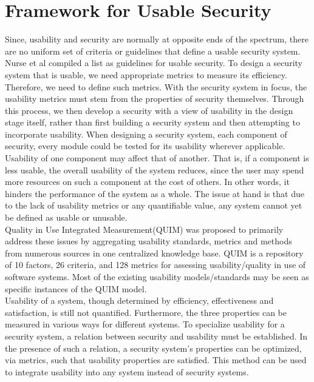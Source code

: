 \section{Framework for Usable Security}
Since, usability and security are normally at opposite ends of the spectrum, there are no uniform set of criteria or guidelines that define a usable security system. Nurse et al\cite{nurse2011guidelines} 
compiled a list as guidelines for usable security.
\newline
To design a security system that is usable, we need appropriate metrics to measure its efficiency. Therefore, we need to define such metrics. With the security system in focus, the usability metrics must stem from the properties of security themselves. Through this process, we then develop a security with a view of usability in the design stage itself, rather than first building a security system and then attempting to incorporate usability. When designing a security system, each component of security, every module could be tested for its usability wherever applicable. Usability of one component may affect that of another. That is, if a component is less usable, the overall usability of the system reduces, since the user may spend more resources on such a component at the cost of others. In other words, it hinders the performance of the system as a whole. The issue at hand is that due to the lack of usability metrics or any quantifiable value, any system cannot yet be defined as usable or unusable. \\


Quality in Use Integrated Measurement(QUIM)\cite{seffah2001quim} was proposed to primarily address these issues by aggregating usability standards, metrics and methods from numerous sources in one centralized knowledge base. QUIM is a repository of 10 factors, 26 criteria, and 128 metrics for assessing usability/quality in use of software systems. Most of the existing usability models/standards may be seen as specific instances of the QUIM model. \\

Usability of a system, though determined by efficiency, effectiveness and satisfaction, is still not quantified. Furthermore, the three properties can be measured in various ways for different systems. To specialize usability for a security system, a relation between security and usability must be established. In the presence of such a relation, a security system's properties can be optimized, via metrics, such that usability properties are satisfied. This method can be used to integrate usability into any system instead of security systems. \\ 

